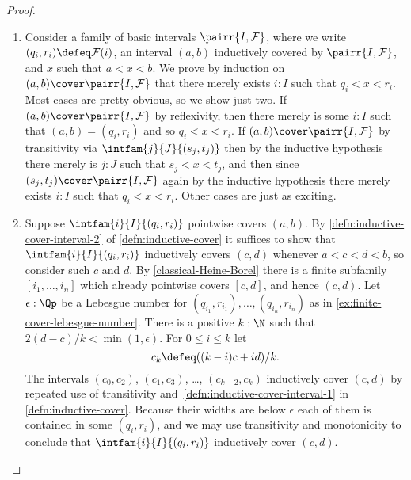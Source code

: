 \begin{proof}
  \mbox{}
  \begin{enumerate}

  \item
    Consider a family of basic intervals $\pairr{I, \mathcal{F}}$, where we write $(q_i,
    r_i) \defeq \mathcal{F}(i)$, an interval $(a,b)$ inductively covered by $\pairr{I,
      \mathcal{F}}$, and $x$ such that $a < x < b$.
    We prove by induction on $(a,b) \cover \pairr{I, \mathcal{F}}$ that there merely
    exists $i : I$ such that $q_i < x < r_i$. Most cases are pretty obvious, so we show
    just two. If $(a,b) \cover \pairr{I, \mathcal{F}}$ by reflexivity, then there merely
    is some $i : I$ such that $(a,b) = (q_i, r_i)$ and so $q_i < x < r_i$. If $(a,b)
    \cover \pairr{I, \mathcal{F}}$ by transitivity via $\intfam{j}{J}{(s_j, t_j)}$ then by
    the inductive hypothesis there merely is $j : J$ such that $s_j < x < t_j$, and then since
    $(s_j, t_j) \cover \pairr{I, \mathcal{F}}$ again by the inductive hypothesis there merely
    exists $i : I$ such that $q_i < x < r_i$. Other cases are just as exciting.

  \item Suppose $\intfam{i}{I}{(q_i, r_i)}$ pointwise covers $(a, b)$. By
    \cref{defn:inductive-cover-interval-2} of \cref{defn:inductive-cover} it
    suffices to show that $\intfam{i}{I}{(q_i, r_i)}$ inductively covers $(c, d)$ whenever
    $a < c < d < b$, so consider such $c$ and $d$. By \cref{classical-Heine-Borel}
    there is a finite subfamily $[i_1, \ldots, i_n]$ which already pointwise covers $[c,
    d]$, and hence $(c,d)$. Let $\epsilon : \Qp$ be a Lebesgue number
    for $(q_{i_1}, r_{i_1}), \ldots, (q_{i_n}, r_{i_n})$ as in
    \cref{ex:finite-cover-lebesgue-number}. There is a positive $k : \N$ such that $2 (d - c)/k
    < \min(1, \epsilon)$. For $0 \leq i \leq k$ let
    \begin{equation*}
      c_k \defeq ((k - i) c + i d) / k.
    \end{equation*}
    The intervals $(c_0, c_2)$, $(c_1, c_3)$, \dots, $(c_{k-2}, c_k)$ inductively cover
    $(c,d)$ by repeated use of transitivity and~\cref{defn:inductive-cover-interval-1}
    in \cref{defn:inductive-cover}. Because their widths are below $\epsilon$ each of
    them is contained in some $(q_i, r_i)$, and we may use transitivity and monotonicity to
    conclude that $\intfam{i}{I}{(q_i, r_i)}$ inductively cover $(c, d)$. \qedhere
  \end{enumerate}
\end{proof}

